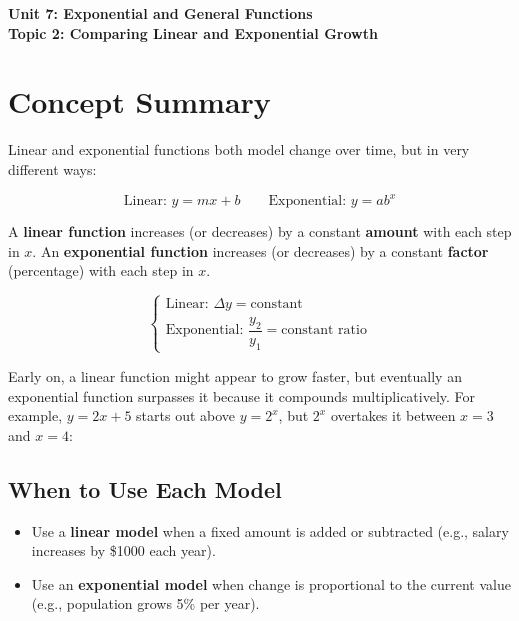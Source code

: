 \documentclass[14pt]{extarticle}
\renewcommand{\emph}[1]{\textbf{#1}}
\begin{document}
\raggedright
{}

\begin{center}
    \LARGE \textbf{Unit 7: Exponential and General Functions} \\[6pt]
    \Large \textbf{Topic 2: Comparing Linear and Exponential Growth}
\end{center}

\vspace{1em}

\section*{Concept Summary}

Linear and exponential functions both model change over time, but in very different ways:

\[
\text{Linear: } y = mx + b \qquad \text{Exponential: } y = a b^x
\]

A \textbf{linear function} increases (or decreases) by a constant \emph{amount} with each step in \(x\).  
An \textbf{exponential function} increases (or decreases) by a constant \emph{factor} (percentage) with each step in \(x\).

\[
\begin{cases}
\text{Linear: } \Delta y = \text{constant} \\
\text{Exponential: } \dfrac{y_2}{y_1} = \text{constant ratio}
\end{cases}
\]

Early on, a linear function might appear to grow faster, but eventually an exponential function surpasses it because it compounds multiplicatively. For example, \(y = 2x + 5\) starts out above \(y = 2^x\), but \(2^x\) overtakes it between \(x = 3\) and \(x = 4\):


\subsection*{When to Use Each Model}
\begin{itemize}
  \item Use a \textbf{linear model} when a fixed amount is added or subtracted (e.g., salary increases by \$1000 each year).
  \item Use an \textbf{exponential model} when change is proportional to the current value (e.g., population grows 5\% per year).
\end{itemize}
\end{document}
